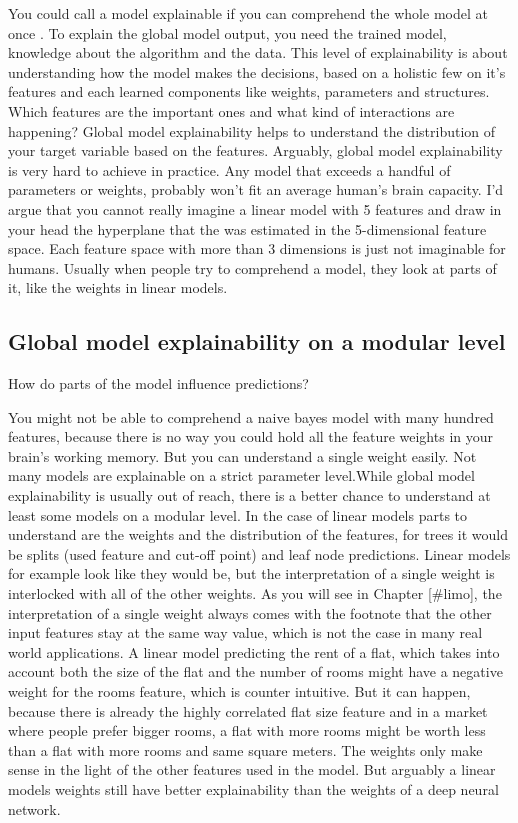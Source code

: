 \documentclass[12pt,]{krantz}
\theoremstyle{definition}
\theoremstyle{definition}
\theoremstyle{definition}
\theoremstyle{remark}
\begin{document}
You could call a model explainable if you can comprehend the whole model
at once \citep{Lipton2016}. To explain the global model output, you need
the trained model, knowledge about the algorithm and the data. This
level of explainability is about understanding how the model makes the
decisions, based on a holistic few on it's features and each learned
components like weights, parameters and structures. Which features are
the important ones and what kind of interactions are happening? Global
model explainability helps to understand the distribution of your target
variable based on the features. Arguably, global model explainability is
very hard to achieve in practice. Any model that exceeds a handful of
parameters or weights, probably won't fit an average human's brain
capacity. I'd argue that you cannot really imagine a linear model with 5
features and draw in your head the hyperplane that the was estimated in
the 5-dimensional feature space. Each feature space with more than 3
dimensions is just not imaginable for humans. Usually when people try to
comprehend a model, they look at parts of it, like the weights in linear
models.

\subsection{Global model explainability on a modular
level}\label{global-model-explainability-on-a-modular-level}

How do parts of the model influence predictions?

You might not be able to comprehend a naive bayes model with many
hundred features, because there is no way you could hold all the feature
weights in your brain's working memory. But you can understand a single
weight easily. Not many models are explainable on a strict parameter
level.While global model explainability is usually out of reach, there
is a better chance to understand at least some models on a modular
level. In the case of linear models parts to understand are the weights
and the distribution of the features, for trees it would be splits (used
feature and cut-off point) and leaf node predictions. Linear models for
example look like they would be, but the interpretation of a single
weight is interlocked with all of the other weights. As you will see in
Chapter {[}\#limo{]}, the interpretation of a single weight always comes
with the footnote that the other input features stay at the same way
value, which is not the case in many real world applications. A linear
model predicting the rent of a flat, which takes into account both the
size of the flat and the number of rooms might have a negative weight
for the rooms feature, which is counter intuitive. But it can happen,
because there is already the highly correlated flat size feature and in
a market where people prefer bigger rooms, a flat with more rooms might
be worth less than a flat with more rooms and same square meters. The
weights only make sense in the light of the other features used in the
model. But arguably a linear models weights still have better
explainability than the weights of a deep neural network.
\end{document}
